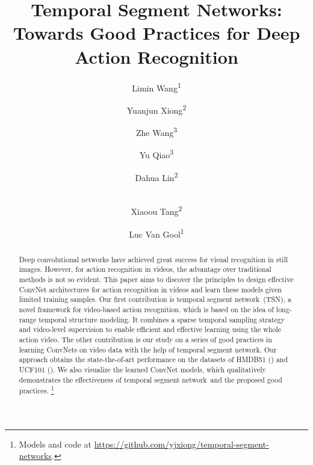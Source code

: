 \documentclass[runningheads]{llncs}
\newcommand{\SEGNET}{temporal segment network}
\begin{document}
\pagestyle{headings}
\mainmatter

\title{Temporal Segment Networks: Towards Good Practices for Deep Action Recognition} 



\author{
	Limin Wang\textsuperscript{1}\and 
	Yuanjun Xiong\textsuperscript{2}\and 
	Zhe Wang\textsuperscript{3}\and 
	Yu Qiao\textsuperscript{3}\and 
	Dahua Lin\textsuperscript{2}\and \\
	Xiaoou Tang\textsuperscript{2}\and
	Luc Van Gool\textsuperscript{1} 
}






\maketitle


\begin{abstract}
	Deep convolutional networks have achieved great success for visual recognition in still images. However, for action recognition in videos, the advantage over traditional methods is not so evident. This paper aims to discover the principles to design effective ConvNet architectures for action recognition in videos and learn these models given limited training samples. 
	Our first contribution is \SEGNET~(TSN), a novel framework for video-based action recognition. which is based on the idea of long-range temporal structure modeling.
	It combines a sparse temporal sampling strategy and video-level supervision to enable efficient and effective learning using the whole action video.
	The other contribution is our study on a series of good practices in learning ConvNets on video data with the help of \SEGNET.
	Our approach obtains the state-the-of-art performance on the datasets of HMDB51 () and UCF101 (). We also visualize the learned ConvNet models, which qualitatively demonstrates the effectiveness of \SEGNET~and the proposed good practices. \footnote{Models and code at \url{https://github.com/yjxiong/temporal-segment-networks}.}
\end{abstract}
\end{document}

